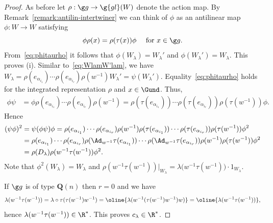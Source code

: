 \documentclass[12pt]{amsart}
\begin{document}
\begin{proof} 
As before let $\rho:\g g\to \g{gl}(W)$ denote the action map. By Remark~\ref{remark:antilin-intertwiner} we can think of $\phi$ as an antilinear map $\phi:W\to W$ satisfying 
\begin{equation}
\label{eq:phitaurho}
\phi\rho(x)=\rho(\tau(x))\phi\quad\text{ for }x\in\g g.
\end{equation} 
From~\eqref{eq:phitaurho} it follows that $\phi(W_\lambda)=W_\lambda'$ and 
$\phi(W_\lambda')=W_\lambda$. This proves (i).
Similar to~\eqref{eq:WlamW'lam}, 
we have
$
W_\lambda=\rho(e_{\alpha_{i_1}})\cdots \rho(e_{\alpha_{i_r}})\rho(w^{-1})W_\lambda'=\psi(W_\lambda')$.
Equality~\eqref{eq:phitaurho} holds for the integrated representation $\rho$ and 
$x\in \Gund$. Thus,
\begin{align*}
\phi\psi
&=\phi\rho(e_{\alpha_{i_1}})\cdots
\rho(e_{\alpha_{i_r}})
\rho(w^{-1})=
\rho(\tau(e_{\alpha_{i_1}}))
\cdots
\rho(\tau(e_{\alpha_{i_r}}))
\rho(\tau(w^{-1}))\phi.
\end{align*}
Hence
\begin{align*}(\psi\phi)^2&=
\psi(\phi\psi)\phi=
\rho(e_{\alpha_{i_1}})\cdots \rho(e_{\alpha_{i_r}})
\rho(w^{-1})
\rho(\tau(e_{\alpha_{i_1}}))
\cdots
\rho(\tau(e_{\alpha_{i_r}}))
\rho(\tau(w^{-1}))\phi^2\\
&=
\rho(e_{\alpha_{i_1}})\cdots \rho(e_{\alpha_{i_r}})
\rho(\Ad_{w^{-1}}\tau(e_{\alpha_{i_1}}))
\cdots
\rho(\Ad_{w^{-1}}\tau(e_{\alpha_{i_r}}))\rho(w^{-1})\rho(\tau(w^{-1}))
\phi^2\\
&=\rho(D_\lambda)\rho(w^{-1}\tau(w^{-1}))\phi^2.
\end{align*}
Note that $\phi^2(W_\lambda)=W_\lambda$
and $\rho(w^{-1}\tau(w^{-1}))\big|_{W_\lambda}=\lambda\big(w^{-1}\tau(w^{-1})\big)\cdot 1_{W_\lambda}$. 

If $\g g$ is of type $\mathbf Q(n)$ then $r=0$  and 
we have 
\[
\lambda(w^{-1}\tau(w^{-1}))=
\lambda\circ\tau(\tau(w^{-1})w^{-1})=
\oline{\lambda(w^{-1}(\tau(w^{-1})w^{-1})w)}
=\oline{\lambda(w^{-1}\tau(w^{-1}))},
\]
hence $\lambda(w^{-1}\tau(w^{-1}))\in \R^*$. This proves $c_\lambda\in\R^*$.  


\end{proof}
\end{document}
